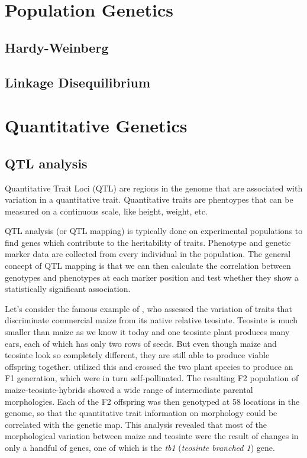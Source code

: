 \documentclass[12pt,]{krantz}
\begin{document}
\chapter{Population Genetics}\label{population-genetics}

\section{Hardy-Weinberg}\label{hardy-weinberg}

\section{Linkage Disequilibrium}\label{linkage-disequilibrium}

\chapter{Quantitative Genetics}\label{quantitative-genetics}

\section{QTL analysis}\label{qtl-analysis}

Quantitative Trait Loci (QTL) are regions in the genome that are
associated with variation in a quantitative trait. Quantitative traits
are phentoypes that can be measured on a continuous scale, like height,
weight, etc.

QTL analysis (or QTL mapping) is typically done on experimental
populations to find genes which contribute to the heritability of
traits. Phenotype and genetic marker data are collected from every
individual in the population. The general concept of QTL mapping is that
we can then calculate the correlation between genotypes and phenotypes
at each marker position and test whether they show a statistically
significant association.

Let's consider the famous example of \citet{Doebley285}, who assessed
the variation of traits that discriminate commercial maize from its
native relative teosinte. Teosinte is much smaller than maize as we know
it today and one teosinte plant produces many ears, each of which has
only two rows of seeds. But even though maize and teosinte look so
completely different, they are still able to produce viable offspring
together. \citet{Doebley285} utilized this and crossed the two plant
species to produce an F1 generation, which were in turn self-pollinated.
The resulting F2 population of maize-teosinte-hybrids showed a wide
range of intermediate parental morphologies. Each of the F2 offspring
was then genotyped at 58 locations in the genome, so that the
quantitative trait information on morphology could be correlated with
the genetic map. This analysis revealed that most of the morphological
variation between maize and teosinte were the result of changes in only
a handful of genes, one of which is the \emph{tb1} (\emph{teosinte
branched 1}) gene.
\end{document}

